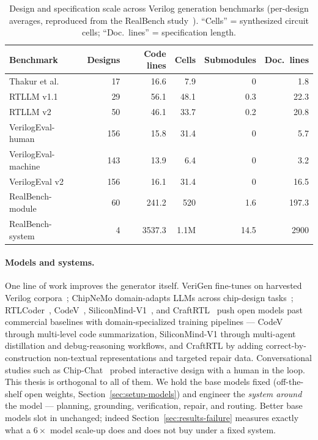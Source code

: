 \begin{table}[htbp]
  \centering
  \caption[Design and specification scale across Verilog benchmarks]{Design
    and specification scale across Verilog generation benchmarks (per-design
    averages, reproduced from the RealBench study~\citep{realbench2025}).
    ``Cells'' =
    synthesized circuit cells; ``Doc.\ lines'' = specification length.}
  \label{tab:bench-stats}
  \small
  \setlength{\tabcolsep}{5pt}
  \begin{tabular}{lrrrrr}
    \toprule
    Benchmark & Designs & Code lines & Cells & Submodules & Doc.\ lines \\
    \midrule
    Thakur et al.~\citep{thakur2023verigen} & 17 & 16.6 & 7.9 & 0 & 1.8 \\
    RTLLM v1.1~\citep{lu2024rtllm} & 29 & 56.1 & 48.1 & 0.3 & 22.3 \\
    RTLLM v2~\citep{lu2024rtllm} & 50 & 46.1 & 33.7 & 0.2 & 20.8 \\
    VerilogEval-human~\citep{liu2023verilogeval} & 156 & 15.8 & 31.4 & 0 & 5.7 \\
    VerilogEval-machine~\citep{liu2023verilogeval} & 143 & 13.9 & 6.4 & 0 & 3.2 \\
    VerilogEval v2~\citep{pinckney2025verilogeval2} & 156 & 16.1 & 31.4 & 0 & 16.5 \\
    RealBench-module~\citep{realbench2025} & 60 & 241.2 & 520 & 1.6 & 197.3 \\
    RealBench-system~\citep{realbench2025} & 4 & 3537.3 & 1.1M & 14.5 & 2900 \\
    \bottomrule
  \end{tabular}
\end{table}

\paragraph{Models and systems.}
One line of work improves the generator itself. VeriGen fine-tunes on
harvested Verilog corpora~\citep{thakur2023verigen}; ChipNeMo domain-adapts
LLMs across chip-design tasks~\citep{liu2023chipnemo};
RTLCoder~\citep{liu2024rtlcoder}, CodeV~\citep{zhao2024codev},
SiliconMind-V1~\citep{siliconmind2025}, and
CraftRTL~\citep{liu2025craftrtl} push open models past commercial
baselines with domain-specialized training pipelines --- CodeV through
multi-level code summarization, SiliconMind-V1 through multi-agent
distillation and debug-reasoning workflows, and CraftRTL by adding
correct-by-construction non-textual
representations and targeted repair data. Conversational studies such as Chip-Chat~\citep{blocklove2023chipchat}
probed interactive design with a human in the loop. This thesis is
orthogonal to all of them. We hold the base models fixed (off-the-shelf
open weights, Section~\ref{sec:setup-models}) and engineer the
\emph{system around} the model --- planning, grounding, verification,
repair, and routing. Better base models slot in unchanged; indeed
Section~\ref{sec:results-failure} measures exactly what a $6\times$ model
scale-up does and does not buy under a fixed system.


